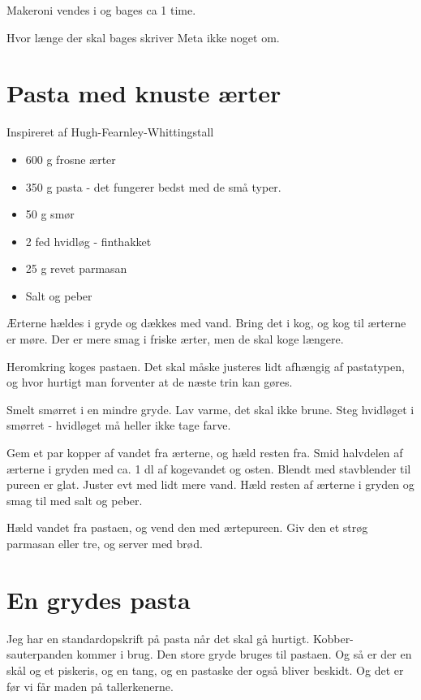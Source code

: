 \documentclass[
]{book}
\providecommand{\tightlist}{%
  \setlength{\itemsep}{0pt}\setlength{\parskip}{0pt}}
\begin{document}
Makeroni vendes i og bages ca 1 time.

Hvor længe der skal bages skriver Meta ikke noget om.

\section{Pasta med knuste ærter}\label{pasta-med-knuste-uxe6rter}

Inspireret af Hugh-Fearnley-Whittingstall

\begin{itemize}
\tightlist
\item
  600 g frosne ærter
\item
  350 g pasta - det fungerer bedst med de små typer.
\item
  50 g smør
\item
  2 fed hvidløg - finthakket
\item
  25 g revet parmasan
\item
  Salt og peber
\end{itemize}

Ærterne hældes i gryde og dækkes med vand. Bring det i kog, og kog til ærterne er møre. Der er mere smag i friske ærter, men de skal koge længere.

Heromkring koges pastaen. Det skal måske justeres lidt afhængig af pastatypen, og hvor hurtigt man forventer at de næste trin kan gøres.

Smelt smørret i en mindre gryde. Lav varme, det skal ikke brune. Steg hvidløget i smørret - hvidløget må heller ikke tage farve.

Gem et par kopper af vandet fra ærterne, og hæld resten fra. Smid halvdelen af ærterne i gryden med ca. 1 dl af kogevandet og osten. Blendt med stavblender til pureen er glat. Juster evt med lidt mere vand. Hæld resten af ærterne i gryden og smag til med salt og peber.

Hæld vandet fra pastaen, og vend den med ærtepureen. Giv den et strøg parmasan eller tre, og server med brød.

\section{En grydes pasta}\label{en-grydes-pasta}

Jeg har en standardopskrift på pasta når det skal gå hurtigt. Kobber-sauterpanden kommer i brug. Den store gryde bruges til pastaen. Og så er der en skål og et piskeris, og en tang, og en pastaske der også bliver beskidt. Og det er før vi får maden på tallerkenerne.
\end{document}
